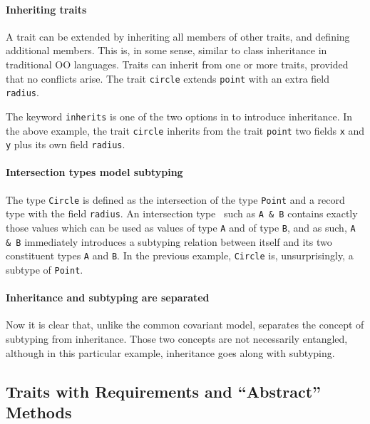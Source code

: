 \paragraph{Inheriting traits}
A trait can be extended by inheriting all members of
other traits, and defining additional members. This is, in some sense, similar
to class inheritance in traditional OO languages. Traits can inherit
from one or more traits, provided that
no conflicts arise. The trait \lstinline$circle$ extends
\lstinline{point} with an extra field \lstinline{radius}.

The keyword \lstinline{inherits} is one of the two options in \name to introduce
inheritance. In the above example, the trait \lstinline{circle} inherits from
the trait \lstinline{point} two fields \lstinline{x} and \lstinline{y} plus its
own field \lstinline{radius}. 

\paragraph{Intersection types model subtyping}
The type \lstinline{Circle} is defined as the intersection of the type
\lstinline{Point} and a record type with the field \lstinline{radius}. An
intersection type~\cite{coppo1981functional,pottinger1980type} such as
\lstinline{A & B} contains exactly those values which can be used as values of
type \lstinline{A} and of type \lstinline{B}, and as such, \lstinline{A & B}
immediately introduces a subtyping relation between itself and its two
constituent types \lstinline{A} and \lstinline{B}. In the previous example,
\lstinline{Circle} is, unsurprisingly, a subtype of \lstinline{Point}.

\paragraph{Inheritance and subtyping are separated}
Now it is clear that, unlike the common covariant
model, \name separates the concept of subtyping from inheritance. Those two
concepts are not necessarily entangled, although in this particular example,
inheritance goes along with subtyping.

\subsection{Traits with Requirements and ``Abstract'' Methods}

